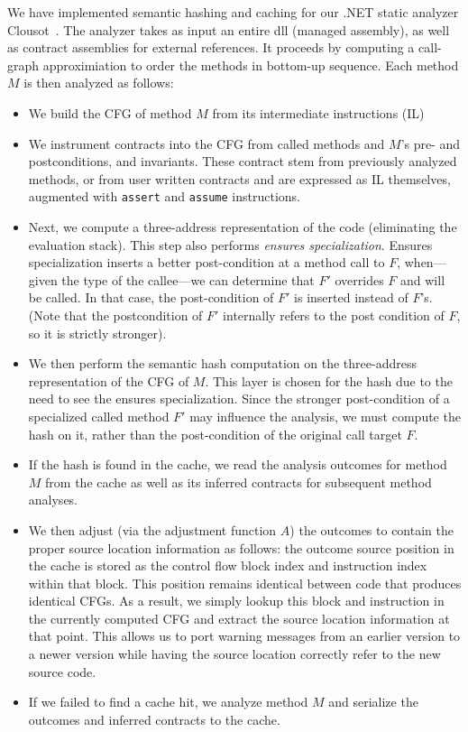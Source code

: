 \documentclass{llncs}
\newcommand{\code}[1]{\lstinline{#1}}
\begin{document}
We have implemented semantic hashing and caching for our .NET static
analyzer Clousot~\cite{MafLogozzo10}. The analyzer takes as input an entire dll
(managed assembly), as well as contract assemblies for external
references. It proceeds by computing a call-graph approximiation to order the
methods in bottom-up sequence. Each method $M$ is then analyzed as follows:
\begin{itemize}
\item We build the CFG of method $M$ from its intermediate instructions (IL) 
\item We instrument contracts into the CFG from called methods and $M$'s
  pre- and postconditions, and invariants. These contract
  stem from previously analyzed methods, or from user written
  contracts and are expressed as IL themselves, augmented with \code{assert} and \code{assume} instructions.

\item Next, we compute a three-address representation of the code
  (eliminating the evaluation stack). This step also performs
  \emph{ensures specialization}. Ensures
  specialization inserts a better post-condition at a method call to
  $F$, when---given the type of the callee---we can determine that
  $F'$ overrides $F$ and will be called. In that case, the
  post-condition of $F'$ is inserted instead of $F$'s. (Note that the
  postcondition of $F'$ internally refers to the post condition of
  $F$, so it is strictly stronger).

\item We then perform the semantic hash computation on the
  three-address representation of the CFG of $M$. This layer is chosen
  for the hash due to the need to see the ensures specialization.  Since
  the stronger post-condition of a specialized called method $F'$ may influence the
  analysis, we must compute the hash on it, rather than the
  post-condition of the original call target $F$.

\item If the hash is found in the cache, we read the analysis outcomes
  for method $M$ from the cache as well as its inferred contracts for
  subsequent method analyses.

\item We then adjust (via the adjustment function $A$) the outcomes to
  contain the proper source location information as follows: the
  outcome source position in the cache is stored as the control flow
  block index and instruction index within that block. This position
  remains identical between code that produces identical CFGs. As a
  result, we simply lookup this block and instruction in the currently
  computed CFG and extract the source location information at that
  point. This allows us to port warning messages from an earlier
  version to a newer version while having the source location
  correctly refer to the new source code.
\item If we failed to find a cache hit, we analyze method $M$ and
  serialize the outcomes and inferred contracts to the cache.
\end{itemize}
\end{document}
